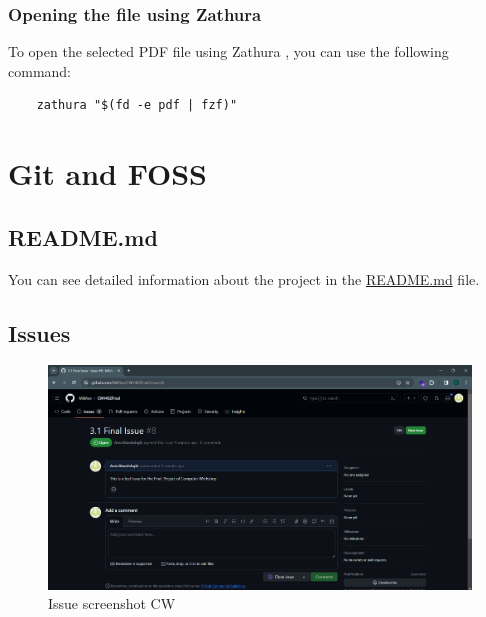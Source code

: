 \documentclass[titlepage]{article}
\begin{document}
	\subsubsection{Opening the file using Zathura}
	To open the selected PDF file using Zathura , you can use the following command:
	\begin{verbatim}
	zathura "$(fd -e pdf | fzf)"
	\end{verbatim}
  
  
  \newpage
	\section{Git and FOSS}
	\subsection{README.md}
	You can see detailed information about the project in the \href{https://github.com/AmirAbasEshghi/Final_project/blob/main/README.md}{README.md} file.

	\subsection{Issues}
	\begin{figure}[ht]
	\centering
	\includegraphics[width=1\textwidth]{issue.png}
	\caption{Issue screenshot CW}
	\end{figure}
\end{document}
